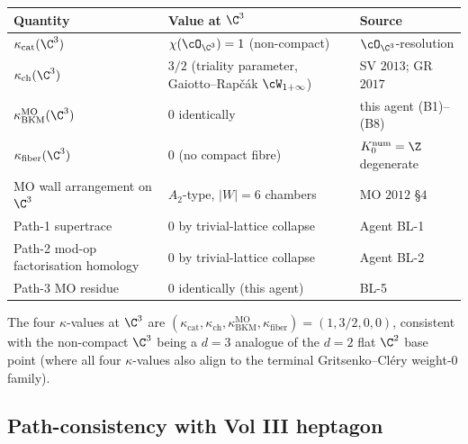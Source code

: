 \begin{center}
\renewcommand{\arraystretch}{1.3}
\begin{tabular}{lll}
 \toprule
 \textbf{Quantity} & \textbf{Value at $\C^3$} & \textbf{Source} \\
 \midrule
 $\kappa_{\mathrm{cat}}(\C^3)$ &
 $\chi(\cO_{\C^3}) = 1$ (non-compact) &
 $\cO_{\C^3}$-resolution \\
 $\kappa_{\mathrm{ch}}(\C^3)$ &
 $3/2$ (triality parameter, Gaiotto--Rap\v{c}\'ak
 $\cW_{1+\infty}$) &
 SV $2013$; GR $2017$ \\
 $\kappa_{\mathrm{BKM}}^{\mathrm{MO}}(\C^3)$ & $0$ identically &
 this agent (B1)--(B8) \\
 $\kappa_{\mathrm{fiber}}(\C^3)$ & $0$ (no compact fibre) &
 $K_0^{\mathrm{num}} = \Z$ degenerate \\
 MO wall arrangement on $\C^3$ &
 $A_2$-type, $|W| = 6$ chambers &
 MO $2012$ \S $4$ \\
 Path-1 supertrace &
 $0$ by trivial-lattice collapse & Agent BL-1 \\
 Path-2 mod-op factorisation homology &
 $0$ by trivial-lattice collapse & Agent BL-2 \\
 Path-3 MO residue &
 $0$ identically (this agent) & BL-5 \\
 \bottomrule
\end{tabular}
\end{center}

The four $\kappa$-values at $\C^3$ are $(\kappa_{\mathrm{cat}},
\kappa_{\mathrm{ch}}, \kappa_{\mathrm{BKM}}^{\mathrm{MO}},
\kappa_{\mathrm{fiber}}) = (1, 3/2, 0, 0)$, consistent with the
non-compact $\C^3$ being a $d = 3$ analogue of the $d = 2$ flat
$\C^2$ base point (where all four $\kappa$-values also align to
the terminal Gritsenko--Cl\'ery weight-$0$ family).

\subsection*{Path-consistency with Vol III heptagon}

